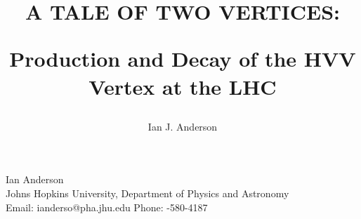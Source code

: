 \documentclass[12pt,oneside,final]{thesis}
\begin{document}
\title{
\begin{Large}
A TALE OF TWO VERTICES: \\
\end{Large}
Production and Decay of the HVV Vertex at the LHC
}
\author{Ian J. Anderson}
\dissertation
\doctorphilosophy
\copyrightnotice










%





\pagebreak
\begin{cv}{{\large Ian Anderson}\\
    {\normalsize Johns Hopkins University, 
      Department of Physics and Astronomy\\
      Email: ianderso@pha.jhu.edu
      \hfill Phone: {-580-4187} 
    }
}

\end{cv}
\end{document}
